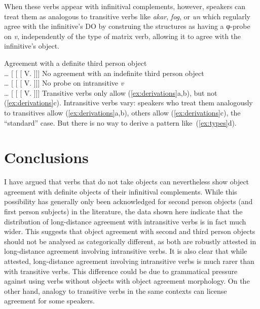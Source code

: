 When these verbs appear with infinitival complements, however, speakers can
treat them as analogous to transitive verbs like \emph{akar}, \emph{fog}, or
\emph{un} which regularly agree with the infinitive's \gls{DO} by construing
the structures as having a φ-probe on \emph{v}, independently of the type of
matrix verb, allowing it to agree with the infinitive's object.

\pex[interpartskip=6ex]\label{ex:derivations}
    \a  Agreement with a definite third person object\\
        \dots{} [  [ [ V.\Inf{}  ]]]
    \a  No agreement with an indefinite third person object\\
        \dots{} [  [ [ V.\Inf{}  ]]]
    \a  No probe on intransitive \emph{v}\\
        \dots{} [  [ [ V.\Inf{}  ]]]
\xe
Transitive verbs only allow (\ref{ex:derivations}a,b), but not
(\ref{ex:derivations}c). Intransitive verbs vary: speakers who treat them
analogously to transitives allow (\ref{ex:derivations}a,b), others allow
(\ref{ex:derivations}c), the \enquote{standard} case. But there is no way to
derive a pattern like~(\ref{ex:types}d).

\section{Conclusions}\label{sec:conclusions}

I have argued that verbs that do not take \Acc{} objects can nevertheless show
object agreement with definite \Acc{} objects of their infinitival complements.
While this possibility has generally only been acknowledged for second person
objects (and first person subjects) in the literature, the data shown here
indicate that the distribution of long-distance agreement with intransitive
verbs is in fact much wider.
%
This suggests that object agreement with second and third person objects should
not be analysed as categorically different, as both are robustly attested in
long-distance agreement involving intransitive verbs.
%
It is also clear that while attested, long-distance agreement involving
intransitive verbs is much rarer than with transitive verbs. This difference
could be due to grammatical pressure against using verbs without \Acc{} objects
with object agreement morphology. On the other hand, analogy to transitive
verbs in the same contexts can license agreement for some speakers.

